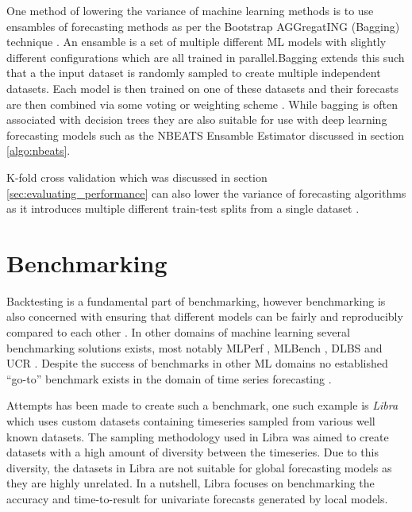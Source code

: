 One method of lowering the variance of machine learning methods is to use ensambles of forecasting methods as per the Bootstrap AGGregatING (Bagging) technique \cite{buhlmann2002analyzing}. An ensamble is a set of multiple different ML models with slightly different configurations which are all trained in parallel.Bagging extends this such that a the input dataset is randomly sampled to create multiple independent datasets. Each model is then trained on one of these datasets and their forecasts are then combined via some voting or weighting scheme \cite{buhlmann2002analyzing}. While bagging is often associated with decision trees they are also suitable for use with deep learning forecasting models such as the NBEATS Ensamble Estimator discussed in section \ref{algo:nbeats}.

K-fold cross validation which was discussed in section \ref{sec:evaluating_performance} can also lower the variance of forecasting algorithms as it introduces multiple different train-test splits from a single dataset \cite{buhlmann2002analyzing}.

\section{Benchmarking}
\label{sec:related_work}

Backtesting is a fundamental part of benchmarking, however benchmarking is also concerned with ensuring that different models can be fairly and reproducibly compared to each other \cite{huang_benchmarking_2019}. In other domains of machine learning several benchmarking solutions exists, most notably MLPerf \cite{mattson_mlperf_2020}, MLBench \cite{noauthor_mlbench_nodate}, DLBS \cite{vassilieva_deep_nodate} and UCR \cite{dau2019ucr}. Despite the success of benchmarks in other ML domains no established “go-to” benchmark exists in the domain of time series forecasting \cite{huang_benchmarking_2019}.

Attempts has been made to create such a benchmark, one such example is \textit{Libra} \cite{bauer2021libra} which uses custom datasets containing timeseries sampled from various well known datasets. The sampling methodology used in Libra was aimed to create datasets with a high amount of diversity between the timeseries. Due to this diversity, the datasets in Libra are not suitable for global forecasting models as they are highly unrelated. In a nutshell, Libra focuses on benchmarking the accuracy and time-to-result for univariate forecasts generated by local models.


